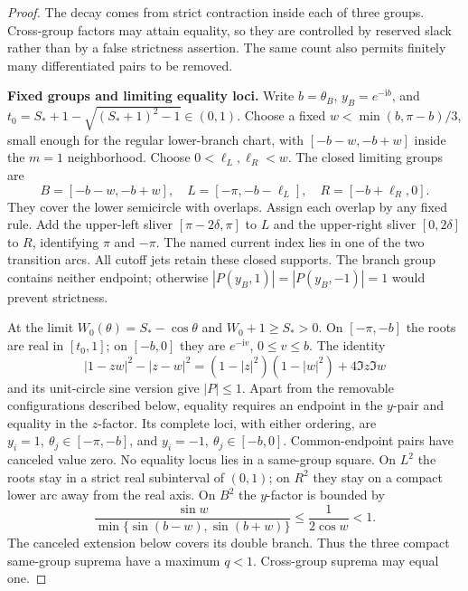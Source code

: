 \documentclass[11pt]{article}
\numberwithin{equation}{section}
\theoremstyle{definition}
\newcommand{\ii}{\mathrm i}
\begin{document}
\begin{proof}
The decay comes from strict contraction inside each of three groups. Cross-group factors may attain equality, so they are controlled by reserved slack rather than by a false strictness assertion. The same count also permits finitely many differentiated pairs to be removed.

\noindent\textbf{Fixed groups and limiting equality loci.}
Write \(b=\theta_B\), \(y_B=e^{-\ii b}\), and
\(t_0=S_*+1-\sqrt{(S_*+1)^2-1}\in(0,1)\).
Choose a fixed \(w<\min(b,\pi-b)/3\), small enough for the
regular lower-branch chart, with \([-b-w,-b+w]\) inside the
\(m=1\) neighborhood. Choose \(0<\ell_L,\ell_R<w\).
The closed limiting groups are
\[
 B=[-b-w,-b+w],\quad L=[-\pi,-b-\ell_L],\quad
 R=[-b+\ell_R,0].
\]
They cover the lower semicircle with overlaps. Assign each overlap
by any fixed rule. Add the upper-left sliver \([\pi-2\delta,\pi]\)
to \(L\) and the upper-right sliver \([0,2\delta]\) to \(R\),
identifying \(\pi\) and \(-\pi\). The named current index lies
in one of the two transition arcs. All cutoff jets retain these
closed supports. The branch group contains neither endpoint;
otherwise \(|P(y_B,1)|=|P(y_B,-1)|=1\) would prevent strictness.

At the limit \(W_0(\theta)=S_*-\cos\theta\) and
\(W_0+1\ge S_*>0\). On \([-\pi,-b]\) the roots are real
in \([t_0,1]\); on \([-b,0]\) they are \(e^{-\ii v}\),
\(0\le v\le b\). The identity
\[
 |1-zw|^2-|z-w|^2
 =(1-|z|^2)(1-|w|^2)+4\Im z\Im w
\]
and its unit-circle sine version give \(|P|\le1\).
Apart from the removable configurations described below, equality
requires an endpoint in the \(y\)-pair and equality in the
\(z\)-factor. Its complete loci, with either ordering, are
\(y_i=1,\ \theta_j\in[-\pi,-b]\), and
\(y_i=-1,\ \theta_j\in[-b,0]\). Common-endpoint pairs have
canceled value zero. No equality locus lies in a same-group square.
On \(L^2\) the roots stay in a strict real subinterval of \((0,1)\);
on \(R^2\) they stay on a compact lower arc away from the real axis.
On \(B^2\) the \(y\)-factor is bounded by
\[
 \frac{\sin w}{\min\{\sin(b-w),\sin(b+w)\}}
 \le\frac1{2\cos w}<1.
\]
The canceled extension below covers its double branch. Thus
the three compact same-group suprema have a maximum \(q<1\).
Cross-group suprema may equal one.


\end{proof}
\end{document}
